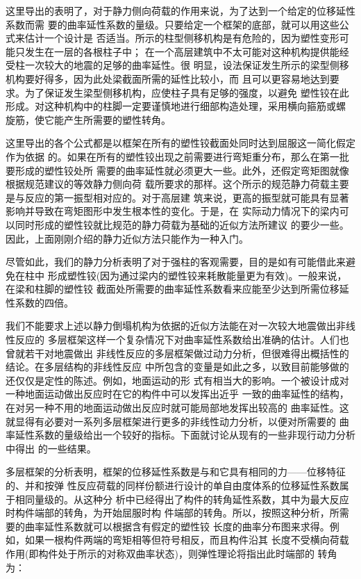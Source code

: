 \documentclass[12pt,a4paper]{book}
\begin{document}
这里导出的表明了，对于静力侧向荷载的作用来说，为了达到一个给定的位移延性系数而需
要的曲率延性系数的量级。只要给定一个框架的底部，就可以用这些公式来估计一个设计是
否适当。所示的柱型侧移机构是有危险的，因为塑性变形可能只发生在一层的各根柱子中；
在一个高层建筑中不太可能对这种机构提供能经受柱一次较大的地震的足够的曲率延性。很
明显，设法保证发生所示的梁型侧移机构要好得多，因为此处梁截面所需的延性比较小，而
且可以更容易地达到要求。为了保证发生梁型侧移机构，应使柱子具有足够的强度，以避免
塑性铰在此形成。对这种机构中的柱脚一定要谨慎地进行细部构造处理，采用横向箍筋或螺
旋筋，使它能产生所需要的塑性转角。

这里导出的各个公式都是以框架在所有的塑性铰截面处同时达到屈服这一简化假定作为依据
的。如果在所有的塑性铰出现之前需要进行弯矩重分布，那么在第一批要形成的塑性铰处所
需要的曲率延性就必须更大一些。此外，还假定弯矩图就像根据规范建议的等效静力侧向荷
载所要求的那样。这个所示的规范静力荷载主要是与反应的第一振型相对应的。对于高层建
筑来说，更高的振型就可能具有显著影响并导致在弯矩图形中发生根本性的变化。于是，在
实际动力情况下的梁内可以同时形成的塑性铰就比规范的静力荷载为基础的近似方法所建议
的要少一些。因此，上面刚刚介绍的静力近似方法只能作为一种入门。

尽管如此，我们的静力分析表明了对于强柱的客观需要，目的是如有可能借此来避免在柱中
形成塑性铰(因为通过梁内的塑性铰来耗散能量更为有效)。一般来说，在梁和柱脚的塑性铰
截面处所需要的曲率延性系数看来应能至少达到所需位移延性系数的四倍。

我们不能要求上述以静力倒塌机构为依据的近似方法能在对一次较大地震做出非线性反应的
多层框架这样一个复杂情况下对曲率延性系数给出准确的估计。人们也曾就若干对地震做出
非线性反应的多层框架做过动力分析，但很难得出概括性的结论。在多层结构的非线性反应
中所包含的变量是如此之多，以致目前能够做的还仅仅是定性的陈述。例如，地面运动的形
式有相当大的影响。一个被设计成对一种地面运动做出反应时在它的构件中可以发挥出近乎
一致的曲率延性的结构，在对另一种不用的地面运动做出反应时就可能局部地发挥出较高的
曲率延性。这就显得有必要对一系列多层框架进行更多的非线性动力分析，以便对所需要的
曲率延性系数的量级给出一个较好的指标。下面就讨论从现有的一些非现行动力分析中得出
的一些结果。

多层框架的分析表明，框架的位移延性系数是与和它具有相同的力——位移特征的、并和按弹
性反应荷载的同样份额进行设计的单自由度体系的位移延性系数属于相同量级的。从这种分
析中已经得出了构件的转角延性系数，其中为最大反应时构件端部的转角，为开始屈服时构
件端部的转角。所以，按照这种分析，所需要的曲率延性系数就可以根据含有假定的塑性铰
长度的曲率分布图来求得。例如，如果一根构件两端的弯矩相等但符号相反，而且构件沿其
长度不受横向荷载作用(即构件处于所示的对称双曲率状态)，则弹性理论将指出此时端部的
转角为：
\end{document}
